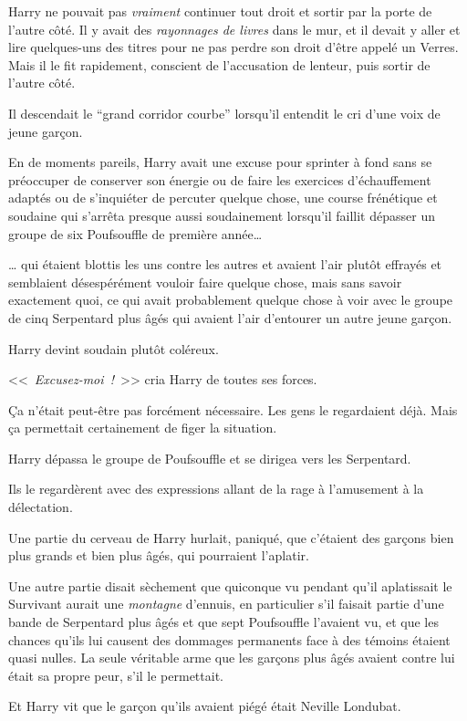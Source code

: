 Harry ne pouvait pas \emph{vraiment} continuer tout droit et sortir par la porte de l'autre côté. Il y avait des \emph{rayonnages de livres} dans le mur, et il devait y aller et lire quelques-uns des titres pour ne pas perdre son droit d'être appelé un Verres. Mais il le fit rapidement, conscient de l'accusation de lenteur, puis sortir de l'autre côté.

Il descendait le “grand corridor courbe” lorsqu'il entendit le cri d'une voix de jeune garçon.

En de moments pareils, Harry avait une excuse pour sprinter à fond sans se préoccuper de conserver son énergie ou de faire les exercices d'échauffement adaptés ou de s'inquiéter de percuter quelque chose, une course frénétique et soudaine qui s'arrêta presque aussi soudainement lorsqu'il faillit dépasser un groupe de six Poufsouffle de première année…

… qui étaient blottis les uns contre les autres et avaient l'air plutôt effrayés et semblaient désespérément vouloir faire quelque chose, mais sans savoir exactement quoi, ce qui avait probablement quelque chose à voir avec le groupe de cinq Serpentard plus âgés qui avaient l'air d'entourer un autre jeune garçon.

Harry devint soudain plutôt coléreux.

<<~\emph{Excusez-moi~!}~>> cria Harry de toutes ses forces.

Ça n'était peut-être pas forcément nécessaire. Les gens le regardaient déjà. Mais ça permettait certainement de figer la situation.

Harry dépassa le groupe de Poufsouffle et se dirigea vers les Serpentard.

Ils le regardèrent avec des expressions allant de la rage à l'amusement à la délectation.

Une partie du cerveau de Harry hurlait, paniqué, que c'étaient des garçons bien plus grands et bien plus âgés, qui pourraient l'aplatir.

Une autre partie disait sèchement que quiconque vu pendant qu'il aplatissait le Survivant aurait une \emph{montagne} d'ennuis, en particulier s'il faisait partie d'une bande de Serpentard plus âgés et que sept Poufsouffle l'avaient vu, et que les chances qu'ils lui causent des dommages permanents face à des témoins étaient quasi nulles. La seule véritable arme que les garçons plus âgés avaient contre lui était sa propre peur, s'il le permettait.

Et Harry vit que le garçon qu'ils avaient piégé était Neville Londubat.

